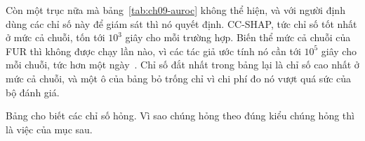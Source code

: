 Còn một trục nữa mà bảng~\ref{tab:ch09-auroc} không thể hiện, và với người
định dùng các chỉ số này để giám sát thì nó quyết định. CC-SHAP, tức chỉ số
tốt nhất ở mức cả chuỗi, tốn tới $10^3$ giây cho mỗi trường hợp. Biến thể mức
cả chuỗi của FUR thì không được chạy lần nào, vì các tác giả ước tính nó cần
tới $10^5$ giây cho mỗi chuỗi, tức hơn một ngày~\autocite{p21metrics}. Chỉ số
đắt nhất trong bảng lại là chỉ số cao nhất ở mức cả chuỗi, và một
ô của bảng bỏ trống chỉ vì chi phí đo nó vượt quá sức của bộ đánh giá.

Bảng cho biết các chỉ số hỏng. Vì sao chúng hỏng theo đúng kiểu chúng hỏng thì
là việc của mục sau.
